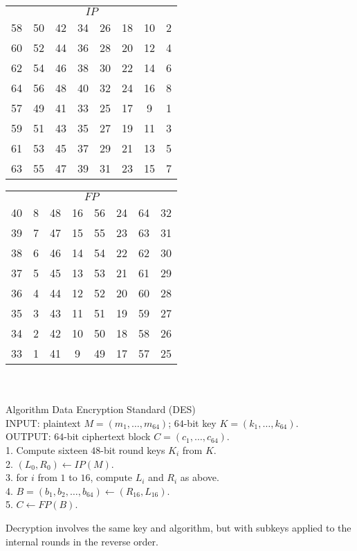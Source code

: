 \documentclass[a4paper, 11pt, openany]{book}
\numberwithin{equation}{section}
\theoremstyle{plain}
\theoremstyle{definition}
\begin{document}
\begin{tabular}{cccccccc}
\multicolumn{8}{c}{$IP$}\\
58 & 50 & 42 & 34 & 26 & 18 & 10 & 2\\
60 & 52 & 44 & 36 & 28 & 20 & 12 & 4\\
62 & 54 & 46 & 38 & 30 & 22 & 14 & 6\\
64 & 56 & 48 & 40 & 32 & 24 & 16 & 8\\
57 & 49 & 41 & 33 & 25 & 17 & 9 & 1\\
59 & 51 & 43 & 35 & 27 & 19 & 11 & 3\\
61 & 53 & 45 & 37 & 29 & 21 & 13 & 5\\
63 & 55 & 47 & 39 & 31 & 23 & 15 & 7
\end{tabular}
\hfill
\begin{tabular}{cccccccc}
\multicolumn{8}{c}{$FP$}\\
40 & 8 & 48 & 16 & 56 & 24 & 64 & 32\\
39 & 7 & 47 & 15 & 55 & 23 & 63 & 31\\
38 & 6 & 46 & 14 & 54 & 22 & 62 & 30\\
37 & 5 & 45 & 13 & 53 & 21 & 61 & 29\\
36 & 4 & 44 & 12 & 52 & 20 & 60 & 28\\
35 & 3 & 43 & 11 & 51 & 19 & 59 & 27\\
34 & 2 & 42 & 10 & 50 & 18 & 58 & 26\\
33 & 1 & 41 & 9 & 49 & 17 & 57 & 25
\end{tabular}
~\\
~\\
Algorithm Data Encryption Standard (DES)\\
INPUT: plaintext $M = (m_1, \dots, m_{64})$; $64$-bit key $K = (k_1, \dots, k_{64})$.\\
OUTPUT: $64$-bit ciphertext block $C = (c_1, \dots, c_{64})$. \\
1. Compute sixteen $48$-bit round keys $K_i$ from $K$.\\
2. $(L_0, R_0) \gets IP(M)$. \\
3. for $i$ from $1$ to $16$, compute $L_i$ and $R_i$ as above.\\
4. $B = (b_1, b_2, \dots, b_{64}) \gets (R_{16}, L_{16})$. \\
5. $C \gets FP(B)$.


Decryption involves the same key and algorithm, but with subkeys applied to the internal rounds in the reverse order.
\end{document}
